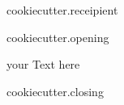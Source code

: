 \documentclass[{{ cookiecutter.format }}]{scrlttr2}
\begin{document}
\begin{letter}{
        {{ cookiecutter.receipient }}
    }
    \opening{ {{cookiecutter.opening}} }
    \begin{flushleft}
        your Text here
    \end{flushleft}
    \closing{ {{cookiecutter.closing}} }
\end{letter}
\end{document}
